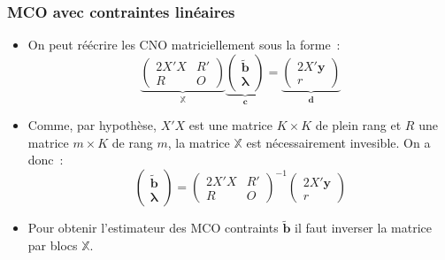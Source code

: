 \documentclass[10pt]{beamer}
\theoremstyle{plain}
\begin{document}
\begin{frame}
  \frametitle{MCO avec contraintes linéaires}

  \begin{itemize}

  \item On peut réécrire les CNO matriciellement sous la forme~:
    \[
      \underbrace{
      \begin{pmatrix}
        2X'X & R'\\
        R & O
      \end{pmatrix}}_{\mathbb X}
    \underbrace{
      \begin{pmatrix}
        \tilde{\mathbf b}\\
        \bm{\lambda}
      \end{pmatrix}}_{\mathbf c}
    =
    \underbrace{
      \begin{pmatrix}
        2X'\mathbf y\\
        r
      \end{pmatrix}}_{\mathbf d}
    \]

    \medskip

  \item Comme, par hypothèse, $X'X$ est une matrice $K\times K$ de plein rang et $R$ une matrice $m\times K$ de rang $m$, la matrice $\mathbb X$ est nécessairement invesible. On a donc~:
    \[
      \begin{pmatrix}
        \tilde{\mathbf b}\\
        \bm{\lambda}
      \end{pmatrix} =
      \begin{pmatrix}
        2X'X & R'\\
        R & O
      \end{pmatrix}^{-1}
      \begin{pmatrix}
        2X'\mathbf y\\
        r
      \end{pmatrix}
    \]

    \medskip

  \item Pour obtenir l'estimateur des MCO contraints $\tilde{\mathbf b}$ il faut inverser la matrice par blocs $\mathbb X$.

  \end{itemize}

\end{frame}
\end{document}
